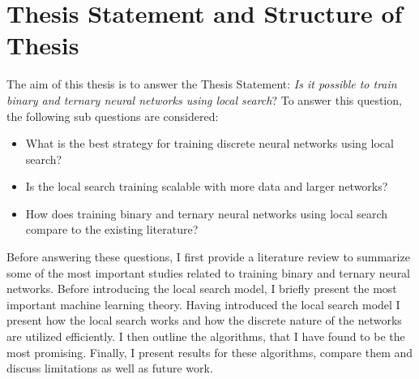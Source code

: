 \section{Thesis Statement and Structure of Thesis}
The aim of this thesis is to answer the Thesis Statement: \textit{Is it possible to train binary and ternary neural networks using local search}? To answer this question, the following sub questions are considered:

\begin{itemize}
    \item What is the best strategy for training discrete neural networks using local search?
    \item Is the local search training scalable with more data and larger networks? 
    \item How does training binary and ternary neural networks using local search compare to the existing literature? 
\end{itemize}

\noindent Before answering these questions, I first provide a literature review to summarize some of the most important studies related to training binary and ternary neural networks. Before introducing the local search model, I briefly present the most important machine learning theory. Having introduced the local search model I present how the local search works and how the discrete nature of the networks are utilized efficiently. I then outline the algorithms, that I have found to be the most promising. Finally, I present results for these algorithms, compare them and discuss limitations as well as future work. 